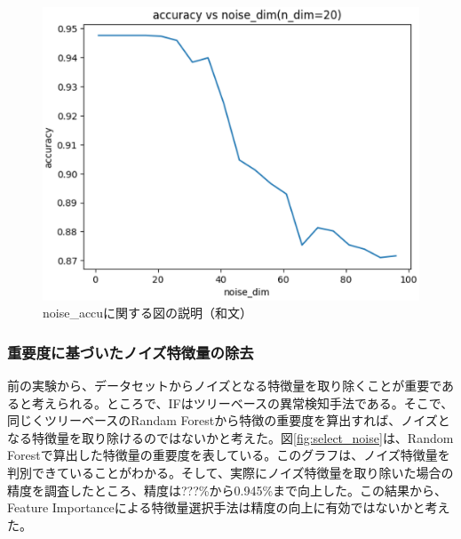 \documentclass{css}
\begin{document}
\begin{figure}[tb]
    \centering
    \includegraphics[width=\linewidth]{pictures/eps/noise_accu.eps}
    \caption{noise\_accuに関する図の説明（和文）}
    \label{fig:noise_accu}
\end{figure}

\subsubsection{重要度に基づいたノイズ特徴量の除去}
前の実験から、データセットからノイズとなる特徴量を取り除くことが重要であると考えられる。ところで、IFはツリーベースの異常検知手法である。そこで、同じくツリーベースのRandam Forestから特徴の重要度を算出すれば、ノイズとなる特徴量を取り除けるのではないかと考えた。図\ref{fig:select_noise}は、Random Forestで算出した特徴量の重要度を表している。このグラフは、ノイズ特徴量を判別できていることがわかる。そして、実際にノイズ特徴量を取り除いた場合の精度を調査したところ、精度は???\%から0.945\%まで向上した。この結果から、Feature Importanceによる特徴量選択手法は精度の向上に有効ではないかと考えた。
\end{document}
